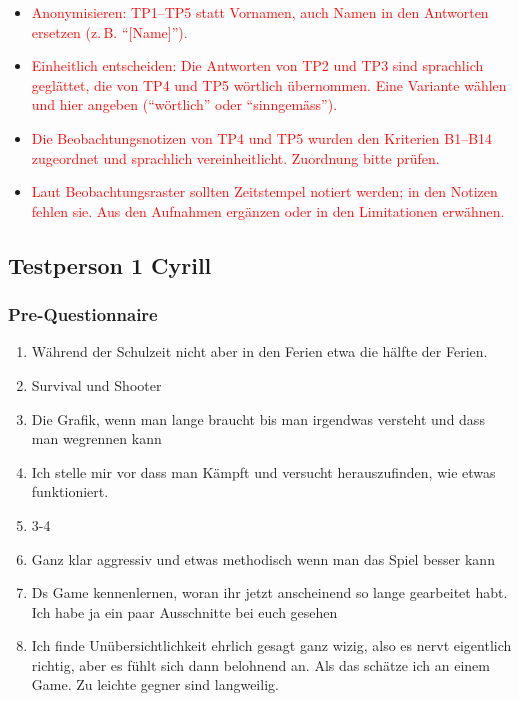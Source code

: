 \documentclass[../Main.tex]{subfiles}
\begin{document}
\begin{itemize}[leftmargin=1.5cm]
    \item \textcolor{red}{Anonymisieren: TP1--TP5 statt Vornamen, auch Namen in den Antworten ersetzen (z.\,B. \enquote{[Name]}).}
    \item \textcolor{red}{Einheitlich entscheiden: Die Antworten von TP2 und TP3 sind sprachlich geglättet, die von TP4 und TP5 wörtlich übernommen. Eine Variante wählen und hier angeben (\enquote{wörtlich} oder \enquote{sinngemäss}).}
    \item \textcolor{red}{Die Beobachtungsnotizen von TP4 und TP5 wurden den Kriterien B1--B14 zugeordnet und sprachlich vereinheitlicht. Zuordnung bitte prüfen.}
    \item \textcolor{red}{Laut Beobachtungsraster sollten Zeitstempel notiert werden; in den Notizen fehlen sie. Aus den Aufnahmen ergänzen oder in den Limitationen erwähnen.}
\end{itemize}

\subsection{Testperson 1 Cyrill}

\subsubsection{Pre-Questionnaire}

\begin{enumerate}[label=\textbf{P\arabic*}, leftmargin=1.5cm, itemsep=0.5em]
    \item Während der Schulzeit nicht aber in den Ferien etwa die hälfte der Ferien.
    \item Survival und Shooter
    \item Die Grafik, wenn man lange braucht bis man irgendwas versteht und dass man wegrennen kann
    \item Ich stelle mir vor dass man Kämpft und versucht herauszufinden, wie etwas funktioniert.
    \item 3-4
    \item Ganz klar aggressiv und etwas methodisch wenn man das Spiel besser kann
    \item Ds Game kennenlernen, woran ihr jetzt anscheinend so lange gearbeitet habt. Ich habe ja ein paar Ausschnitte bei euch gesehen
    \item Ich finde Unübersichtlichkeit ehrlich gesagt ganz wizig, also es nervt eigentlich richtig, aber es fühlt sich dann belohnend an. Als das schätze ich an einem Game. Zu leichte gegner sind langweilig.
\end{enumerate}
\end{document}
